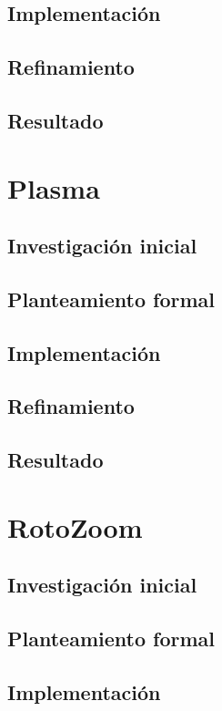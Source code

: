 \subsection{Implementación}
\subsection{Refinamiento}
\subsection{Resultado}

\section{Plasma}

\subsection{Investigación inicial}
\subsection{Planteamiento formal}
\subsection{Implementación}
\subsection{Refinamiento}
\subsection{Resultado}

\section{RotoZoom}

\subsection{Investigación inicial}
\subsection{Planteamiento formal}
\subsection{Implementación}
